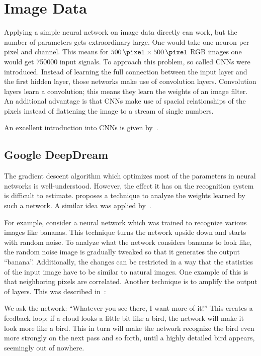 
\section{Image Data}\label{sec:images}%
Applying a simple neural network on image data directly can work, but the number
of parameters gets extraordinary large. One would take one neuron per pixel and
channel. This means for $\SI{500}{\pixel} \times \SI{500}{\pixel}$ RGB images
one would get \num{750000} input signals. To approach this problem, so called
\glspl{CNN} were introduced. Instead of learning the full connection between
the input layer and the first hidden layer, those networks make use of
convolution layers. Convolution layers learn a convolution; this means they
learn the weights of an image filter. An additional advantage is that
\glspl{CNN} make use of spacial relationships of the pixels instead of
flattening the image to a stream of single numbers.

An excellent introduction into \glspl{CNN} is given by~\cite{Nielsen2015}.


\subsection{Google DeepDream}\label{subsec:google-deepdream}%
The gradient descent algorithm which optimizes most of the parameters in neural
networks is well-understood. However, the effect it has on the recognition
system is difficult to estimate. \cite{inceptionism2015} proposes a technique
to analyze the weights learned by such a network. A similar idea was applied
by~\cite{vondrick2013hoggles}.

For example, consider a neural network which was trained to recognize various
images like bananas. This technique turns the network upside down and starts
with random noise. To analyze what the network considers bananas to look like,
the random noise image is gradually tweaked so that it generates the output
\enquote{banana}. Additionally, the changes can be restricted in a way that the
statistics of the input image have to be similar to natural images. One example
of this is that neighboring pixels are correlated.
\goodbreak
Another technique is to amplify the output of layers. This was described
in~\cite{inceptionism2015}:\nobreak%
\begin{displayquote}
We ask the network: \enquote{Whatever you see there, I want more of it!} This
creates a feedback loop: if a cloud looks a little bit like a bird, the network
will make it look more like a bird. This in turn will make the network
recognize the bird even more strongly on the next pass and so forth, until a
highly detailed bird appears, seemingly out of nowhere.
\end{displayquote}

